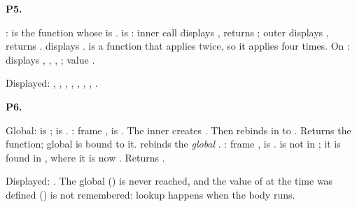\documentclass[10pt]{scrartcl}
\begin{document}
\begin{prob}\textbf{P5.}
\begin{steps}
  \ii {}:  is the function  whose  is .
  \ii {} is : inner call displays , returns ; outer displays , returns .  displays .
  \ii {} is a function that applies  twice, so it applies  four times. On : displays , , , ; value .
\end{steps}
Displayed: , , , , , , , .
\end{prob}

\begin{prob}\textbf{P6.}
\begin{steps}
  \ii Global:  is ;  is .
  \ii {}: frame ,  is . The inner  creates . Then  rebinds  in  to . Returns the  function; global  is bound to it.
  \ii {} rebinds the \emph{global} .
  \ii {}: frame ,  is .  is not in ; it is found in , where it is now . Returns .
\end{steps}
Displayed: . The global  () is never reached, and the value of  at the time  was defined () is not remembered: lookup happens when the body runs.
\end{prob}
\end{document}
